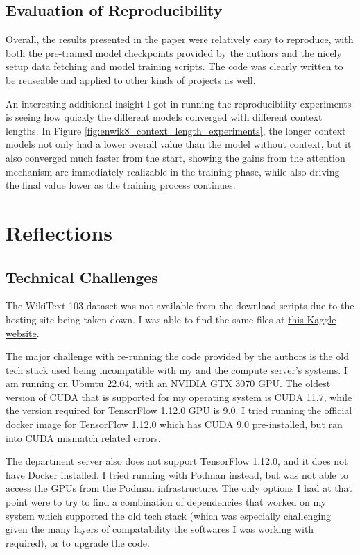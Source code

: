 \documentclass[11pt]{article}
\begin{document}
\subsection{Evaluation of Reproducibility}

Overall, the results presented in the paper were relatively easy to reproduce, with both the pre-trained model checkpoints provided by the authors and the nicely setup data fetching and model training scripts. The code was clearly written to be reuseable and applied to other kinds of projects as well. 

An interesting additional insight I got in running the reproducibility experiments is seeing how quickly the different models converged with different context lengths. In Figure \ref{fig:enwik8_context_length_experiments}, the longer context models not only had a lower overall value than the model without context, but it also converged much faster from the start, showing the gains from the attention mechanism are immediately realizable in the training phase, while also driving the final value lower as the training process continues.

\section{Reflections}

\subsection{Technical Challenges}

The WikiText-103 dataset was not available from the download scripts due to the hosting site being taken down. I was able to find the same files at \hyperlink{https://www.kaggle.com/datasets/rohitgr/wikitext}{this Kaggle website}.

The major challenge with re-running the code provided by the authors is the old tech stack used being incompatible with my and the compute server's systems. I am running on Ubuntu 22.04, with an NVIDIA GTX 3070 GPU. The oldest version of CUDA that is supported for my operating system is CUDA 11.7, while the version required for TensorFlow 1.12.0 GPU is 9.0. I tried running the official docker image for TensorFlow 1.12.0 which has CUDA 9.0 pre-installed, but ran into CUDA mismatch related errors. 

The department server also does not support TensorFlow 1.12.0, and it does not have Docker installed. I tried running with Podman instead, but was not able to access the GPUs from the Podman infrastructure. The only options I had at that point were to try to find a combination of dependencies that worked on my system which supported the old tech stack (which was especially challenging given the many layers of compatability the softwares I was working with required), or to upgrade the code.
\end{document}
